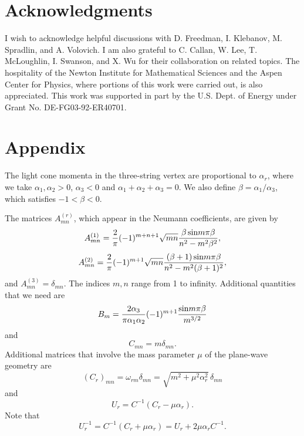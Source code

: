 \documentclass[a4paper,12pt]{article}
\begin{document}
\section*{Acknowledgments}
I wish to acknowledge helpful discussions with D. Freedman, I.
Klebanov, M. Spradlin, and A. Volovich. I am also grateful to C.
Callan, W. Lee, T. McLoughlin, I. Swanson, and X. Wu for their
collaboration on related topics. The hospitality of the Newton
Institute for Mathematical Sciences and the Aspen Center for
Physics, where portions of this work were carried out, is also
appreciated. This work was supported in part by the U.S. Dept. of
Energy under Grant No. DE-FG03-92-ER40701.

\section*{Appendix}

The light cone momenta in the three-string vertex are proportional
to $\alpha_r$, where we take $\alpha_1, \alpha_2 > 0$, $\alpha_3 <
0$ and $\alpha_1 + \alpha_2 + \alpha_3 =0$. We also define $\beta
= \alpha_1 / \alpha_3$, which satisfies $ -1 < \beta < 0$.

The matrices $A^{(r)}_{mn}$, which appear in the Neumann
coefficients, are given by
\begin{equation}
A^{(1)}_{mn} = {2 \over \pi} (-1)^{m+n+1}  \sqrt{m n} {\beta \,
{\rm sin} m \pi \beta \over n^2 - m^2 \beta^2},
\end{equation}
\begin{equation}
A^{(2)}_{mn} = {2 \over \pi} (-1)^{m+1}  \sqrt{m n} {(\beta +1)\,
{\rm sin} m \pi \beta \over n^2 - m^2 (\beta +1)^2},
\end{equation}
and $A^{(3)}_{mn} = \delta_{mn}$. The indices $m,n$ range from 1
to infinity. Additional quantities that we need are
\begin{equation}
B_m = {2 \alpha_3 \over \pi \alpha_1 \alpha_2} (-1)^{m+1} { {\rm
sin} m \pi \beta \over m^{3/2} }
\end{equation}
and
\begin{equation}
C_{mn} = m \delta_{mn}.
\end{equation}
Additional matrices that involve the mass parameter $\mu$ of the
plane-wave geometry are
\begin{equation}
(C_r)_{mn} = \omega_{rm} \delta_{mn} = \sqrt{m^2 + \mu^2
\alpha_r^2}\, \delta_{mn}
\end{equation}
and
\begin{equation}
U_r = C^{-1} (C_r -\mu \alpha_r).
\end{equation}
Note that
\begin{equation} \label{Uformula}
U_r^{-1} = C^{-1} (C_r + \mu \alpha_r) = U_r + 2 \mu \alpha_r
C^{-1}.
\end{equation}
\end{document}
